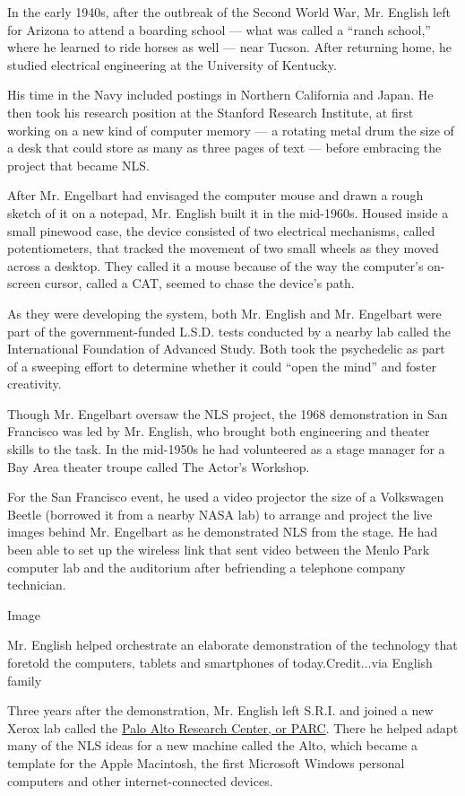 In the early 1940s, after the outbreak of the Second World War, Mr.
English left for Arizona to attend a boarding school --- what was called
a ``ranch school,'' where he learned to ride horses as well --- near
Tucson. After returning home, he studied electrical engineering at the
University of Kentucky.

His time in the Navy included postings in Northern California and Japan.
He then took his research position at the Stanford Research Institute,
at first working on a new kind of computer memory --- a rotating metal
drum the size of a desk that could store as many as three pages of text
--- before embracing the project that became NLS.

After Mr. Engelbart had envisaged the computer mouse and drawn a rough
sketch of it on a notepad, Mr. English built it in the mid-1960s. Housed
inside a small pinewood case, the device consisted of two electrical
mechanisms, called potentiometers, that tracked the movement of two
small wheels as they moved across a desktop. They called it a mouse
because of the way the computer's on-screen cursor, called a CAT, seemed
to chase the device's path.

As they were developing the system, both Mr. English and Mr. Engelbart
were part of the government-funded L.S.D. tests conducted by a nearby
lab called the International Foundation of Advanced Study. Both took the
psychedelic as part of a sweeping effort to determine whether it could
``open the mind'' and foster creativity.

Though Mr. Engelbart oversaw the NLS project, the 1968 demonstration in
San Francisco was led by Mr. English, who brought both engineering and
theater skills to the task. In the mid-1950s he had volunteered as a
stage manager for a Bay Area theater troupe called The Actor's Workshop.

For the San Francisco event, he used a video projector the size of a
Volkswagen Beetle (borrowed it from a nearby NASA lab) to arrange and
project the live images behind Mr. Engelbart as he demonstrated NLS from
the stage. He had been able to set up the wireless link that sent video
between the Menlo Park computer lab and the auditorium after befriending
a telephone company technician.

Image

Mr. English helped orchestrate an elaborate demonstration of the
technology that foretold the computers, tablets and smartphones of
today.Credit...via English family

Three years after the demonstration, Mr. English left S.R.I. and joined
a new Xerox lab called the \href{https://www.parc.com/}{Palo Alto
Research Center, or PARC}. There he helped adapt many of the NLS ideas
for a new machine called the Alto, which became a template for the Apple
Macintosh, the first Microsoft Windows personal computers and other
internet-connected devices.

